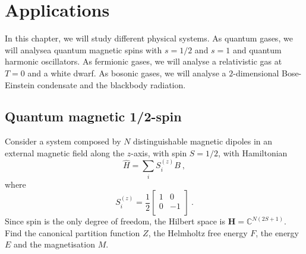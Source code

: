 \chapter{Applications}

    In this chapter, we will study different physical systems. As quantum gases, we will analysea quantum magnetic spins with $s= 1/2$ and $s =1$ and quantum harmonic oscillators. As fermionic gases, we will analyse a relativistic gas at $T=0$ and a white dwarf. As bosonic gases, we will analyse a $2$-dimensional Bose-Einstein condensate and the blackbody radiation.

\section{Quantum magnetic 1/2-spin}

    \begin{exercise}
        Consider a system composed by $N$ distinguishable magnetic dipoles in an external magnetic field along the $z$-axis, with spin $S = 1/2$, with Hamiltonian 
        \begin{equation*}
            \hat H = \sum_i S^{(z)}_i B ~,
        \end{equation*}
        where
        \begin{equation*}
            S^{(z)}_i = \frac{1}{2} \begin{bmatrix}
                1 & 0 \\
                0 & -1 \\
            \end{bmatrix} ~.
        \end{equation*}
        Since spin is the only degree of freedom, the Hilbert space is $\mathbf H = \mathbb C^{N (2S + 1)}$.
        Find the canonical partition function $Z$, the Helmholtz free energy $F$, the energy $E$ and the magnetisation $M$.
    \end{exercise}

